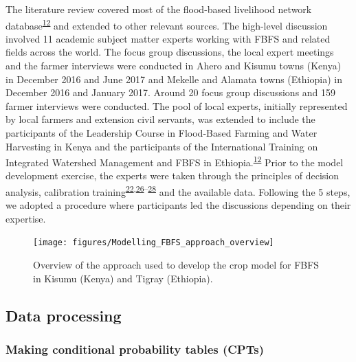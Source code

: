 \documentclass[12pt,oneside]{article}
\begin{document}
The literature review covered most of the flood-based livelihood network database\textsuperscript{\protect\hyperlink{ref-FBLN_2018}{12}} and extended to other relevant sources. The high-level discussion involved 11 academic subject matter experts working with FBFS and related fields across the world. The focus group discussions, the local expert meetings and the farmer interviews were conducted in Ahero and Kisumu towns (Kenya) in December 2016 and June 2017 and Mekelle and Alamata towns (Ethiopia) in December 2016 and January 2017. Around 20 focus group discussions and 159 farmer interviews were conducted. The pool of local experts, initially represented by local farmers and extension civil servants, was extended to include the participants of the Leadership Course in Flood-Based Farming and Water Harvesting in Kenya and the participants of the International Training on Integrated Watershed Management and FBFS in Ethiopia.\textsuperscript{\protect\hyperlink{ref-FBLN_2018}{12}} Prior to the model development exercise, the experts were taken through the principles of decision analysis, calibration training\textsuperscript{\protect\hyperlink{ref-Hubbard_2014}{22},\protect\hyperlink{ref-Luedeling_et_al_2015}{26}--\protect\hyperlink{ref-Whitney_et_al_2018a}{28}} and the available data. Following the 5 steps, we adopted a procedure where participants led the discussions depending on their expertise.

\begin{figure}[!htbp]

{\centering \texttt{[image: figures/Modelling\_FBFS\_approach\_overview]} 

}

\caption{Overview of the approach used to develop the crop model for FBFS in Kisumu (Kenya) and Tigray (Ethiopia).}\label{fig:fig3}
\end{figure}

\hypertarget{III3}{%
\subsection{Data processing}\label{III3}}

\hypertarget{III31}{%
\subsubsection{Making conditional probability tables (CPTs)}\label{III31}}
\end{document}
